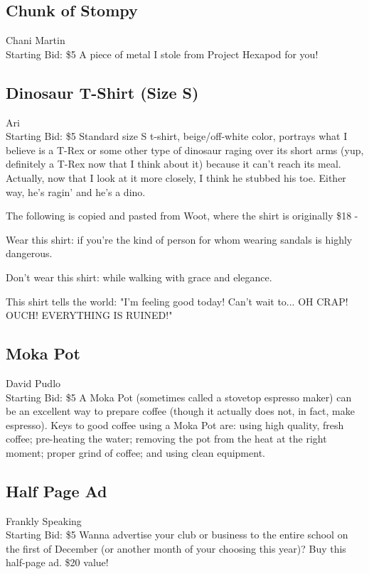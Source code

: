 \documentclass[11pt]{article}
\begin{document}
\subsection{Chunk of Stompy}
Chani Martin
\\
Starting Bid: \$5
\newline
A piece of metal I stole from Project Hexapod for you!
\subsection{Dinosaur T-Shirt (Size S)}
Ari
\\
Starting Bid: \$5
\newline
Standard size S t-shirt, beige/off-white color, portrays what I believe is a T-Rex or some other type of dinosaur raging over its short arms (yup, definitely a T-Rex now that I think about it) because it can't reach its meal. Actually, now that I look at it more closely, I think he stubbed his toe. Either way, he's ragin' and he's a dino.

The following is copied and pasted from Woot, where the shirt is originally \$18 -

Wear this shirt: if you're the kind of person for whom wearing sandals is highly dangerous.

Don't wear this shirt: while walking with grace and elegance.

This shirt tells the world: "I'm feeling good today! Can't wait to... OH CRAP! OUCH! EVERYTHING IS RUINED!"
\subsection{Moka Pot}
David Pudlo
\\
Starting Bid: \$5
\newline
A Moka Pot (sometimes called a stovetop espresso maker) can be an excellent way to prepare coffee (though it actually does not, in fact, make espresso). Keys to good coffee using a Moka Pot are: using high quality, fresh coffee; pre-heating the water; removing the pot from the heat at the right moment; proper grind of coffee; and using clean equipment.
\subsection{Half Page Ad}
Frankly Speaking
\\
Starting Bid: \$5
\newline
Wanna advertise your club or business to the entire school on the first of December (or another month of your choosing this year)? Buy this half-page ad. \$20 value!
\end{document}
